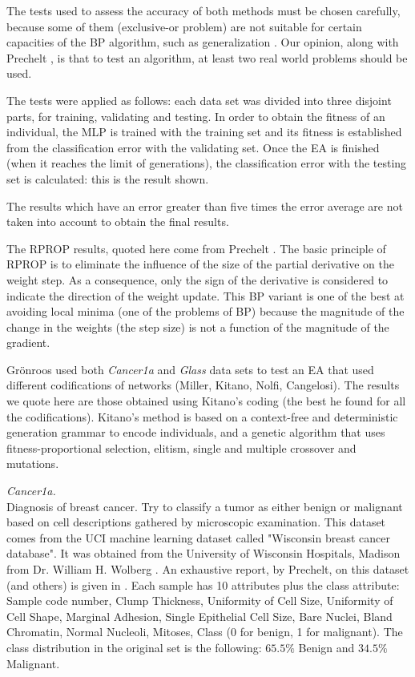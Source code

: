 \documentclass{llncs}
\begin{document}
The tests used to assess the accuracy of both methods must be chosen carefully, because some of them (exclusive-or problem) are not suitable for certain capacities of the BP algorithm, such as generalization \cite{FahlmanBENCHMARKS}. Our opinion, along with Prechelt \cite{Prechelt94c}, is that to test an algorithm, at least two real world problems should be used.

The tests were applied as follows: each data set was divided into three disjoint parts, for training, validating and testing. In order to obtain the fitness of an individual, the MLP is trained with the training set and its fitness is established from the classification error with the validating set. 
Once the EA is finished (when it reaches the limit of generations), the classification error with the testing set is calculated: this is the result shown.

The results which have an error greater than five times the error average are not taken into account to obtain the final results.

The {RPROP} results, quoted here come from Prechelt \cite{Prechelt94c}. 
The basic principle of {RPROP} \cite{Riedmiller93,Riedmiller94} is to eliminate the influence of the size of the partial derivative on the weight step. As a consequence, only the sign of the derivative is considered to indicate the direction of the weight update. This BP variant is one of the best at avoiding local minima (one of the problems of BP) because the magnitude of the change in the weights (the step size) is not a function of the magnitude of the gradient.

Gr\"{o}nroos \cite{MAG98} used both \emph{Cancer1a} and \emph{Glass} data sets to test an EA that used different codifications of networks (Miller, Kitano, Nolfi, Cangelosi). The results we quote here are those obtained using Kitano's coding (the best he found for all the codifications). Kitano's method \cite{Kitano90a,Kitano90b} is based on a context-free and deterministic generation grammar to encode individuals, and a genetic algorithm that uses fitness-proportional selection, elitism, single and multiple crossover and mutations.

\emph{Cancer1a.} \\
Diagnosis of breast cancer. Try to classify a tumor as either benign or malignant based on cell descriptions gathered by microscopic examination.
This dataset comes from the UCI machine learning dataset called "Wisconsin breast cancer database". It was obtained from the University of Wisconsin  Hospitals, Madison from Dr. William H. Wolberg \cite{Wolberg}.
An exhaustive report, by Prechelt, on this dataset (and others) is given in \cite{Prechelt94c}.
Each sample has 10 attributes plus the class attribute: Sample code number, Clump Thickness, Uniformity of Cell Size, Uniformity of Cell Shape, Marginal Adhesion, Single Epithelial Cell Size, Bare Nuclei, Bland Chromatin, Normal Nucleoli, Mitoses, Class (0 for benign, 1 for malignant).
The class distribution in the original set is the following: $65.5\%$ Benign and $34.5\%$ Malignant.
\end{document}
